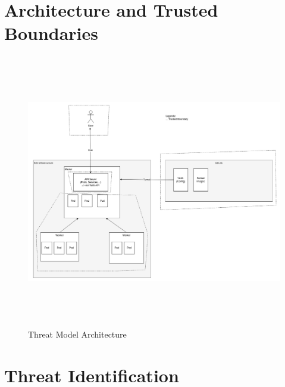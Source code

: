\section{Architecture and Trusted Boundaries}

\begin{figure}[h]
    \centering
    \caption{\label{fig:threat-model-architecture}Threat Model Architecture}
    \includegraphics[height=12cm]{resources/architecture_threat_model.png}
\end{figure}


\newpage
\section{Threat Identification}

